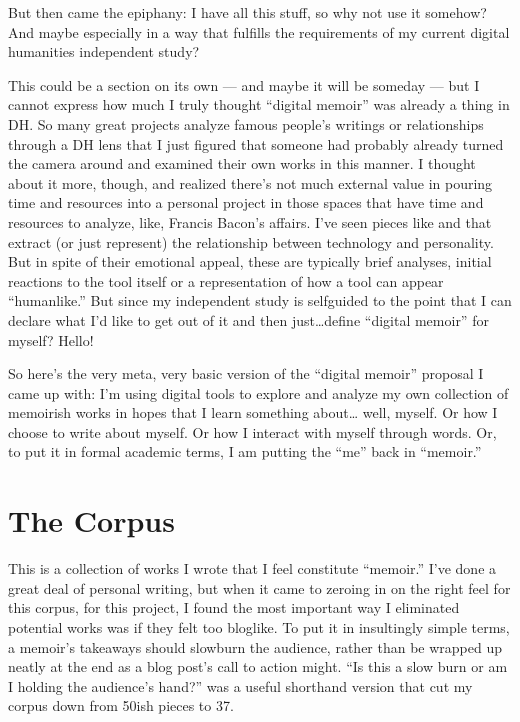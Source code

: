\documentclass[letterpaper,10pt,english]{jupyterBook}
\begin{document}
\sphinxAtStartPar
But then came the epiphany: I have all this stuff, so why not use it somehow? And maybe especially in a way that fulfills the requirements of my current digital humanities independent study?

\sphinxAtStartPar
{}

\sphinxAtStartPar
This could be a section on its own — and maybe it will be someday — but I cannot express how much I truly thought “digital memoir” was already a thing in DH. So many great projects analyze famous people’s writings or relationships through a DH lens that I just figured that someone had probably already turned the camera around and examined their own works in this manner. I thought about it more, though, and realized there’s not much external value in pouring time and resources into a personal project in those spaces that have time and resources to analyze, like, Francis Bacon’s affairs. I’ve seen pieces like  and  that extract (or just represent) the relationship between technology and personality. But in spite of their emotional appeal, these are typically brief analyses, initial reactions to the tool itself or a representation of how a tool can appear “humanlike.” But since my independent study is self\sphinxhyphen{}guided to the point that I can declare what I’d like to get out of it and then just…define “digital memoir” for myself? Hello!

\sphinxAtStartPar
So here’s the very meta, very basic version of the “digital memoir” proposal I came up with: I’m using digital tools to explore and analyze my own collection of memoir\sphinxhyphen{}ish works in hopes that I learn something about… well, myself. Or how I choose to write about myself. Or how I interact with myself through words. Or, to put it in formal academic terms, I am putting the “me” back in “memoir.”


\section{The Corpus}
\label{\detokenize{part1:the-corpus}}
\sphinxAtStartPar
This is a collection of works I wrote that I feel constitute “memoir.” I’ve done a great deal of personal writing, but when it came to zeroing in on the right feel for this corpus, for this project, I found the most important way I eliminated potential works was if they felt too blog\sphinxhyphen{}like. To put it in insultingly simple terms, a memoir’s takeaways should slow\sphinxhyphen{}burn the audience, rather than be wrapped up neatly at the end as a blog post’s call to action might. “Is this a slow burn or am I holding the audience’s hand?” was a useful shorthand version that cut my corpus down from 50\sphinxhyphen{}ish pieces to 37.
\end{document}
